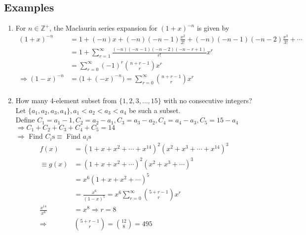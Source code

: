 \documentclass[a4paper]{article}
\begin{document}
\subsection*{Examples}
\begin{enumerate}
    \item For $n\in\mathbb{Z}^+$, the Maclaurin series expansion for $(1+x)^{-n}$ is given by
    \begin{align*}
        (1+x)^{-n}&=1+(-n)x+(-n)(-n-1)\frac{x^2}{2!}+(-n)(-n-1)(-n-2)\frac{x^3}{3!}+\cdots\\
        &=1+\sum_{r=1}^{\infty}{\frac{(-n)(-n-1)(-n-2)(-n-r+1)}{r!}x^r}\\
        &=\sum_{r=0}^{\infty}{(-1)^r\binom{n+r-1}{r} x^r}\\
        \Rightarrow (1-x)^{-n}&=\bigl(1+(-x)^{-n}\bigr)=\sum_{r=0}^{\infty}{\binom{n+r-1}{r} x^r}\\
    \end{align*}
    \item How many 4-element subset from $\{1,2,3,\ldots,15\}$ with no consecutive integers?\\
    Let $\{a_1,a_2,a_3,a_4\}, a_1<a_2<a_3<a_4$ be such a subset.\\
    Define $C_1=a_1-1,C_2=a_2-a_1,C_3=a_3-a_2,C_4=a_4-a_3,C_5=15-a_4$\\
    $\Rightarrow C_1+C_2+C_3+C_4+C_5=14$\\
    $\Rightarrow$ Find $C_i\text{s}\equiv$ Find $a_i\text{s}$
    \begin{align*}
    f(x)&=(1+x+x^2+\cdots+x^{14})^2(x^2+x^3+\cdots+x^{14})^3\\
    \equiv g(x)&=(1+x+x^2+\cdots)^2(x^2+x^3+\cdots)^3\\
    &=x^6(1+x+x^2+\cdots)^5\\
    &=\frac{x^6}{(1-x)^5}=x^6\sum_{r=0}^{\infty}{\binom{5+r-1}{r}x^r}\\
    \frac{x^14}{x^6}&=x^8\Rightarrow r=8\\
    \Rightarrow&\binom{5+r-1}{r}=\binom{12}{8}=495
    \end{align*}
\end{enumerate}
\end{document}
